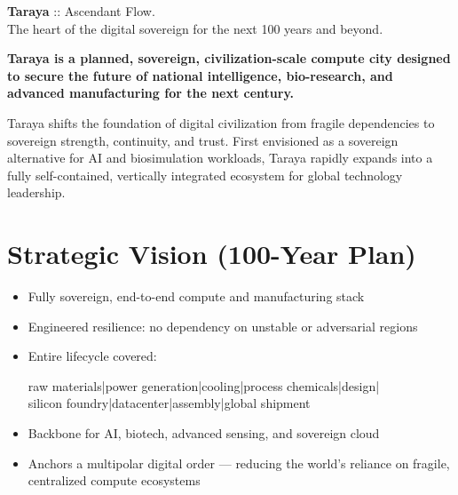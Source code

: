 \documentclass[12pt]{article}
\begin{document}
    \begin{center}
    {\huge \textbf{Taraya}} {\Large :: Ascendant Flow.}\\[0.25em]
    {\large The heart of the digital sovereign for the next 100 years and beyond.}\\[1em]
    \end{center}

    \begin{spacing}{1.08}

        \noindent
        \textbf{Taraya is a planned, sovereign, civilization-scale compute city \textemdash{} designed to secure the future of national intelligence, bio-research, and advanced manufacturing for the next century.}

        \noindent
        Taraya shifts the foundation of digital civilization from fragile dependencies to sovereign strength, continuity, and trust.  First envisioned as a sovereign alternative for AI and biosimulation workloads, Taraya rapidly expands into a fully self-contained, vertically integrated ecosystem for global technology leadership.

        \section*{Strategic Vision (100-Year Plan)}
        \begin{itemize}
            \item Fully sovereign, end-to-end compute and manufacturing stack
            \item Engineered resilience: no dependency on unstable or adversarial regions
            \item Entire lifecycle covered:
            \begin{center}
                raw materials|power generation|cooling|process chemicals|design| \\
                silicon foundry|datacenter|assembly|global shipment
            \end{center}
            \item Backbone for AI, biotech, advanced sensing, and sovereign cloud
            \item Anchors a multipolar digital order — reducing the world's reliance on fragile, centralized compute ecosystems
        \end{itemize}


\end{spacing}
\end{document}
